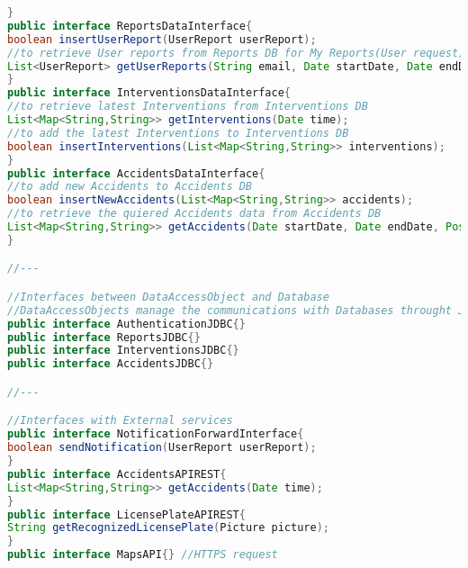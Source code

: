 \documentclass[../../DD.tex]{subfiles}
\begin{document}
\begin{lstlisting}[language=Java]
}
public interface ReportsDataInterface{
boolean insertUserReport(UserReport userReport);
//to retrieve User reports from Reports DB for My Reports(User request) and Ticket feedback(Municipality request)
List<UserReport> getUserReports(String email, Date startDate, Date endDate, String typeOfViolation, Position position, String licensePlate);
}
public interface InterventionsDataInterface{
//to retrieve latest Interventions from Interventions DB
List<Map<String,String>> getInterventions(Date time);
//to add the latest Interventions to Interventions DB
boolean insertInterventions(List<Map<String,String>> interventions);
}
public interface AccidentsDataInterface{
//to add new Accidents to Accidents DB
boolean insertNewAccidents(List<Map<String,String>> accidents);
//to retrieve the quiered Accidents data from Accidents DB
List<Map<String,String>> getAccidents(Date startDate, Date endDate, Position position);
}

//---

//Interfaces between DataAccessObject and Database
//DataAccessObjects manage the communications with Databases throught JDBC APIs
public interface AuthenticationJDBC{}
public interface ReportsJDBC{}
public interface InterventionsJDBC{}
public interface AccidentsJDBC{}

//---

//Interfaces with External services
public interface NotificationForwardInterface{
boolean sendNotification(UserReport userReport);
}
public interface AccidentsAPIREST{
List<Map<String,String>> getAccidents(Date time);
}
public interface LicensePlateAPIREST{
String getRecognizedLicensePlate(Picture picture);
}
public interface MapsAPI{} //HTTPS request

\end{lstlisting}


\newpage
\end{document}
